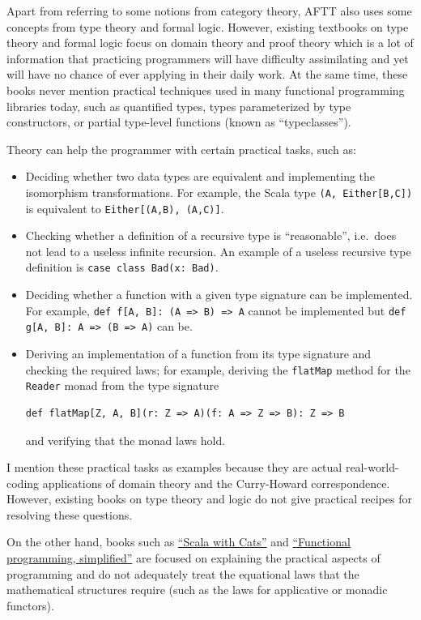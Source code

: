 Apart from referring to some notions from category theory, AFTT also
uses some concepts from type theory and formal logic. However, existing
textbooks on type theory and formal logic focus on domain theory and
proof theory \textendash{} which is a lot of information that practicing
programmers will have difficulty assimilating and yet will have no
chance of ever applying in their daily work. At the same time, these
books never mention practical techniques used in many functional programming
libraries today, such as quantified types, types parameterized by
type constructors, or partial type-level functions (known as ``typeclasses'').

Theory can help the programmer with certain practical tasks, such
as:
\begin{itemize}
\item Deciding whether two data types are equivalent and implementing the
isomorphism transformations. For example, the Scala type \lstinline!(A, Either[B,C])!
is equivalent to \lstinline!Either[(A,B), (A,C)]!.
\item Checking whether a definition of a recursive type is ``reasonable'',
i.e.~does not lead to a useless infinite recursion. An example of
a useless recursive type definition is \lstinline!case class Bad(x: Bad)!.
\item Deciding whether a function with a given type signature can be implemented.
For example, \lstinline!def f[A, B]: (A => B) => A! cannot be implemented
but \lstinline!def g[A, B]: A => (B => A)! can be. 
\item Deriving an implementation of a function from its type signature and
checking the required laws; for example, deriving the \lstinline!flatMap!
method for the \lstinline!Reader! monad from the type signature 
\begin{lstlisting}
def flatMap[Z, A, B](r: Z => A)(f: A => Z => B): Z => B
\end{lstlisting}
and verifying that the monad laws hold.
\end{itemize}
I mention these practical tasks as examples because they are actual
real-world-coding applications of domain theory and the Curry-Howard
correspondence. However, existing books on type theory and logic do
not give practical recipes for resolving these questions.

On the other hand, books such as \href{https://underscore.io/books/scala-with-cats/}{\textquotedblleft Scala with Cats\textquotedblright}
and \href{https://alvinalexander.com/scala/functional-programming-simplified-book}{\textquotedblleft Functional programming, simplified\textquotedblright}
are focused on explaining the practical aspects of programming and
do not adequately treat the equational laws that the mathematical
structures require (such as the laws for applicative or monadic functors).

